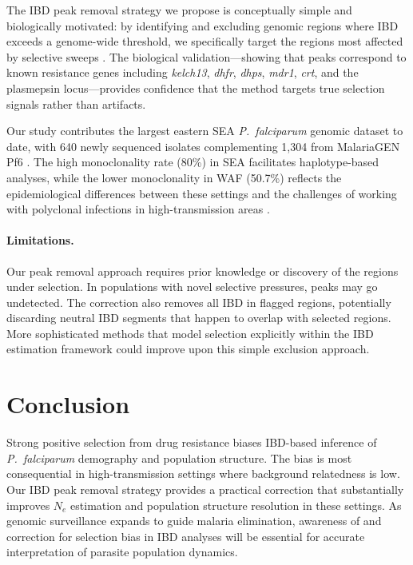 \documentclass[11pt]{article}
\begin{document}
The IBD peak removal strategy we propose is conceptually simple and biologically motivated: by identifying and excluding genomic regions where IBD exceeds a genome-wide threshold, we specifically target the regions most affected by selective sweeps \citep{henden2018selection_ibd}. The biological validation---showing that peaks correspond to known resistance genes including \textit{kelch13}, \textit{dhfr}, \textit{dhps}, \textit{mdr1}, \textit{crt}, and the plasmepsin locus---provides confidence that the method targets true selection signals rather than artifacts.

Our study contributes the largest eastern SEA \textit{P.~falciparum} genomic dataset to date, with 640 newly sequenced isolates complementing 1,304 from MalariaGEN Pf6 \citep{malariagen2021pf6}. The high monoclonality rate (80\%) in SEA facilitates haplotype-based analyses, while the lower monoclonality in WAF (50.7\%) reflects the epidemiological differences between these settings and the challenges of working with polyclonal infections in high-transmission areas \citep{zhu2019deploid}.

\paragraph{Limitations.} Our peak removal approach requires prior knowledge or discovery of the regions under selection. In populations with novel selective pressures, peaks may go undetected. The correction also removes all IBD in flagged regions, potentially discarding neutral IBD segments that happen to overlap with selected regions. More sophisticated methods that model selection explicitly within the IBD estimation framework could improve upon this simple exclusion approach.

\section{Conclusion}

Strong positive selection from drug resistance biases IBD-based inference of \textit{P.~falciparum} demography and population structure. The bias is most consequential in high-transmission settings where background relatedness is low. Our IBD peak removal strategy provides a practical correction that substantially improves $N_e$ estimation and population structure resolution in these settings. As genomic surveillance expands to guide malaria elimination, awareness of and correction for selection bias in IBD analyses will be essential for accurate interpretation of parasite population dynamics.



\end{document}
